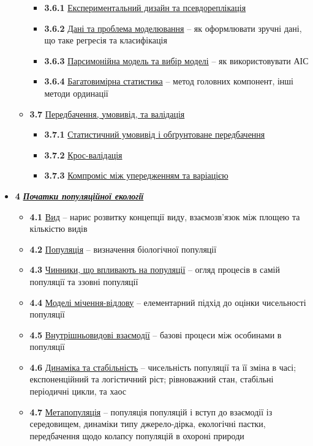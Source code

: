 \documentclass[
  11pt,
]{book}
\begin{document}
\begin{itemize}
\begin{itemize}
    \begin{itemize}
    \item
      \textbf{3.6.1} \hyperref[pseudoreplication]{Експериментальний дизайн та псевдореплікація}
    \item
      \textbf{3.6.2} \hyperref[regression]{Дані та проблема моделювання} -- як оформлювати зручні дані, що таке регресія та класифікація
    \item
      \textbf{3.6.3} \hyperref[aic]{Парсимонійна модель та вибір моделі} -- як використовувати АІС
    \item
      \textbf{3.6.4} \hyperref[prcomp]{Багатовимірна статистика} -- метод головних компонент, інші методи ординації
    \end{itemize}
  \item
    \textbf{3.7} \hyperref[infer]{Передбачення, умовивід, та валідація}

    \begin{itemize}
    \item
      \textbf{3.7.1} \hyperref[inference]{Статистичний умовивід і обґрунтоване передбачення}
    \item
      \textbf{3.7.2} \hyperref[crossval]{Крос-валідація}
    \item
      \textbf{3.7.3} \hyperref[bias-variance]{Компроміс між упередженням та варіацією}
    \end{itemize}
  \end{itemize}
\item
  \textbf{4} \hyperref[popeco]{\textbf{\emph{Початки популяційної екології}}}

  \begin{itemize}
  \item
    \textbf{4.1} \hyperref[species]{Вид} -- нарис розвитку концепції виду, взаємозв'язок між площею та кількістю видів
  \item
    \textbf{4.2} \hyperref[population]{Популяція} -- визначення біологічної популяції
  \item
    \textbf{4.3} \hyperref[pop-factors]{Чинники, що впливають на популяції} -- огляд процесів в самій популяції та ззовні популяції
  \item
    \textbf{4.4} \hyperref[cmr]{Моделі мічення-відлову} -- елементарний підхід до оцінки чисельності популяції
  \item
    \textbf{4.5} \hyperref[intraspecific]{Внутрішньовидові взаємодії} -- базові процеси між особинами в популяції
  \item
    \textbf{4.6} \hyperref[pop-dynamics]{Динаміка та стабільність} -- чисельність популяції та її зміна в часі; експоненційний та логістичний ріст; рівноважний стан, стабільні періодичні цикли, та хаос
  \item
    \textbf{4.7} \hyperref[metapopulation]{Метапопуляція} -- популяція популяцій і вступ до взаємодії із середовищем, динаміки типу джерело-дірка, екологічні пастки, передбачення щодо колапсу популяцій в охороні природи
  \end{itemize}
\end{itemize}
\end{document}
